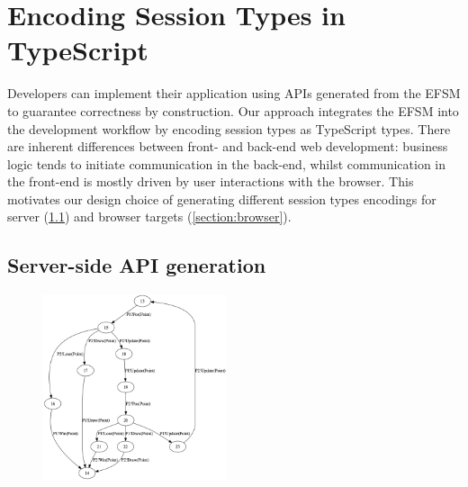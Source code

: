 \section{Encoding Session Types in TypeScript}

Developers can implement their application using APIs generated from the EFSM
to guarantee correctness by construction.
Our approach integrates the EFSM into the development workflow by encoding
session types as TypeScript types.
There are inherent differences between front- and back-end web development:
business logic tends to initiate communication in the back-end, whilst
communication in the front-end is mostly driven by user interactions with the
browser. This motivates our design choice of generating different session types
encodings for server (\cref{section:server}) and browser targets
(\cref{section:browser}).



\subsection{Server-side API generation}
\label{section:server}

\begin{figure}
  \vspace{-5mm}
  \begin{center}
    \includegraphics[width=0.48\textwidth]{figures/efsm_svr.png}
  \end{center}

  \vspace{-5mm}
  \label{fig:efsmsvr}
\vspace{-1cm}
\end{figure}

